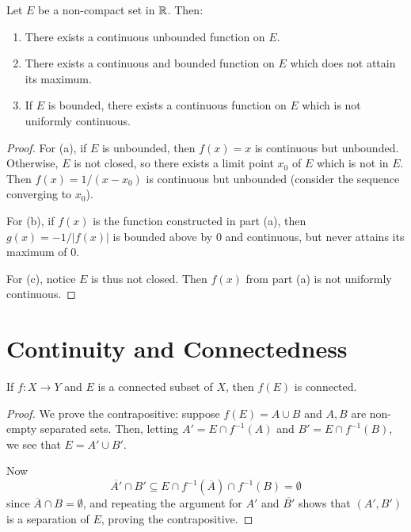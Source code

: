 \begin{theorem} %
    Let $E$ be a non-compact set in $\mathbb{R}$. Then:
    \begin{enumerate}
        \item There exists a continuous unbounded function on $E$.
        \item There exists a continuous and bounded function on $E$ which does not attain its maximum.
        \item If $E$ is bounded, there exists a continuous function on $E$ which is not uniformly continuous.
    \end{enumerate}

\begin{proof}
    For (a), if $E$ is unbounded, then $f(x) = x$ is continuous but unbounded. Otherwise, $E$ is not closed, so there exists a limit point $x_0$ of $E$ which is not in $E$. Then $f(x) = 1/(x-x_0)$ is continuous but unbounded (consider the sequence converging to $x_0$).

    For (b), if $f(x)$ is the function constructed in part (a), then $g(x) = -1/|f(x)|$ is bounded above by 0 and continuous, but never attains its maximum of 0.

    For (c), notice $E$ is thus not closed. Then $f(x)$ from part (a) is not uniformly continuous.
\end{proof}
\end{theorem}

\section{Continuity and Connectedness}

\begin{theorem} %
    If $f: X \to Y$ and $E$ is a connected subset of $X$, then $f(E)$ is connected.
\begin{proof}
    We prove the contrapositive: suppose $f(E) = A \cup B$ and $A, B$ are non-empty separated sets. Then, letting $A' = E \cap f^{-1}(A)$ and $B' = E \cap f^{-1}(B)$, we see that $E = A' \cup B'$.

Now 
\[
    \overline{A'} \cap B' \subseteq E \cap f^{-1}(\overline{A}) \cap f^{-1}(B) = \emptyset
\]
since $\overline{A} \cap B = \emptyset$, and repeating the argument for $A'$ and $\overline{B'}$ shows that $(A', B')$ is a separation of $E$, proving the contrapositive.
\end{proof}
\end{theorem}

